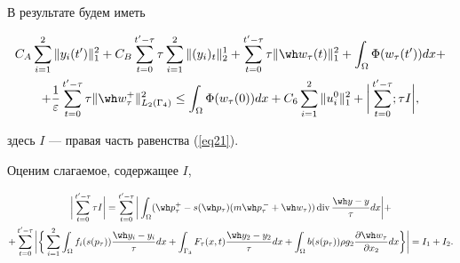 \begin{pf}
В результате будем иметь


\begin{multline}


C_{A} \sum_{i=1}^{2} \| y_{i}(t') \|_{1}^{2} + C_{B} 


\sum_{t=0}^{t'- \tau} \tau \sum_{i=1}^{2}\|(y_{i})_{t}\|^1_2 +


\sum_{t=0}^{t'- \tau} \tau \| \wh w_{\tau}(t) \|_{1}^{2}


+\int_{\Omega} \Phi(w_{\tau}(t')) dx + \\


%


+ \frac{1}{\varepsilon} \sum_{t=0}^{t'- \tau} \tau \|


\wh w_{\tau}^{+} \|^{2}_{L_{2}(\Gamma_{4})}\leq


\int_{\Omega} \Phi(w_{\tau}(0)) dx + C_6 \sum_{i=1}


^{2} \| u_{i}^{0} \|_{1}^{2} + \bigg | \sum_{t=0}^{t'- \tau};


\tau I \bigg|,\label{eq23}


\end{multline}


здесь $I$ --- правая часть равенства (\ref{eq21}).





Оценим слагаемое, содержащее $I$,


\begin{multline*}


\bigg| \sum_{t=0}^{t'- \tau} \tau I \bigg| = \sum_{t=0}^{t'- \tau}


\bigg| \int_{\Omega} (\wh p_{\tau}^{+}-s(\wh p_{\tau})


(m \wh p_{\tau}^{\,-}+


\wh w_{\tau})) \Div \frac{\wh y-y}{\tau} dx \bigg| + \\


%


+ \sum_{t=0}^{t'- \tau} \bigg| \bigg \{


\sum_{i=1}^{2} \int_{\Omega} f_{i} (s(p_{\tau})


) \frac{\wh y_{i}-y_{i}}{\tau} dx +


\int_{\Gamma_{3}} F_{\tau}(x,t) \frac{\wh y_{2}-


y_{2}}{\tau} dx + \int_{\Omega} b (s(p_{\tau})


) \rho g_{2} \frac{\partial \wh w_{\tau}}{\partial x_{2}}


dx \bigg \} \bigg| = I_{1} + I_{2}.


\end{multline*}



\end{pf}
